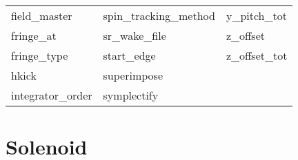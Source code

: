 \begin{tabular}{lll}
field_master                & spin_tracking_method        & y_pitch_tot                 \\
fringe_at                   & sr_wake_file                & z_offset                    \\
fringe_type                 & start_edge                  & z_offset_tot                \\
hkick                       & superimpose                 &                             \\
integrator_order            & symplectify                 &                             \\
 \bottomrule
 \end{tabular}
 \vfill
 
 \section{Solenoid}
 \label{s:list.solenoid}
 
